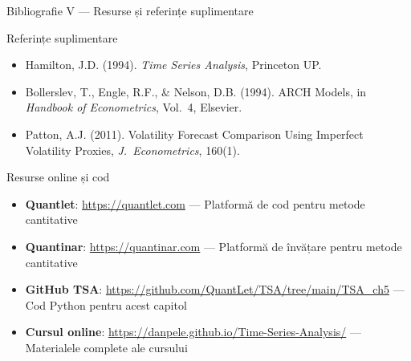 \documentclass[9pt, aspectratio=169, t]{beamer}
\begin{document}
\begin{frame}{Bibliografie V --- Resurse și referințe suplimentare}
    \small
        \begin{block}{Referințe suplimentare}
            \begin{itemize}
                \item Hamilton, J.D. (1994). \textit{Time Series Analysis}, Princeton UP.
                \item Bollerslev, T., Engle, R.F., \& Nelson, D.B. (1994). ARCH Models, in \textit{Handbook of Econometrics}, Vol.\ 4, Elsevier.
                \item Patton, A.J. (2011). Volatility Forecast Comparison Using Imperfect Volatility Proxies, \textit{J.\ Econometrics}, 160(1).
            \end{itemize}
        \end{block}
        \vspace{-0.15cm}
        \begin{exampleblock}{Resurse online și cod}
            \begin{itemize}\setlength{\itemsep}{3pt}
                \item \textbf{Quantlet}: \url{https://quantlet.com} --- Platformă de cod pentru metode cantitative
                \item \textbf{Quantinar}: \url{https://quantinar.com} --- Platformă de învățare pentru metode cantitative
                \item \textbf{GitHub TSA}: \url{https://github.com/QuantLet/TSA/tree/main/TSA_ch5} --- Cod Python pentru acest capitol
                \item \textbf{Cursul online}: \url{https://danpele.github.io/Time-Series-Analysis/} --- Materialele complete ale cursului
            \end{itemize}
        \end{exampleblock}
\end{frame}
\end{document}
